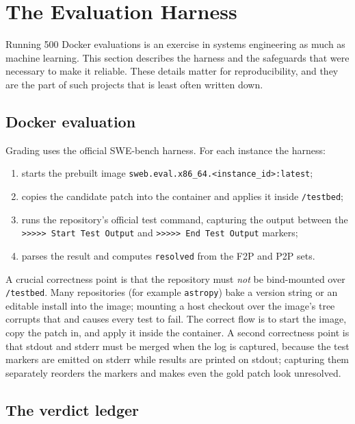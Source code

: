 \documentclass[11pt,a4paper]{article}
\begin{document}
\section{The Evaluation Harness}
\label{sec:harness}

Running 500 Docker evaluations is an exercise in systems engineering as much as machine
learning. This section describes the harness and the safeguards that were necessary to
make it reliable. These details matter for reproducibility, and they are the part of such
projects that is least often written down.

\subsection{Docker evaluation}

Grading uses the official SWE-bench harness. For each instance the harness:

\begin{enumerate}[leftmargin=1.4em]
  \item starts the prebuilt image \texttt{sweb.eval.x86\_64.<instance\_id>:latest};
  \item copies the candidate patch into the container and applies it inside
  \texttt{/testbed};
  \item runs the repository's official test command, capturing the output between the
  \texttt{>>>>> Start Test Output} and \texttt{>>>>> End Test Output} markers;
  \item parses the result and computes \texttt{resolved} from the F2P and P2P sets.
\end{enumerate}

A crucial correctness point is that the repository must \emph{not} be bind-mounted over
\texttt{/testbed}. Many repositories (for example \texttt{astropy}) bake a
version string or an editable install into the image; mounting a host checkout over the
image's tree corrupts that and causes every test to fail. The correct flow is to start
the image, copy the patch in, and apply it inside the container. A second correctness
point is that stdout and stderr must be merged when the log is captured, because the test
markers are emitted on stderr while results are printed on stdout; capturing them
separately reorders the markers and makes even the gold patch look unresolved.

\subsection{The verdict ledger}
\end{document}
